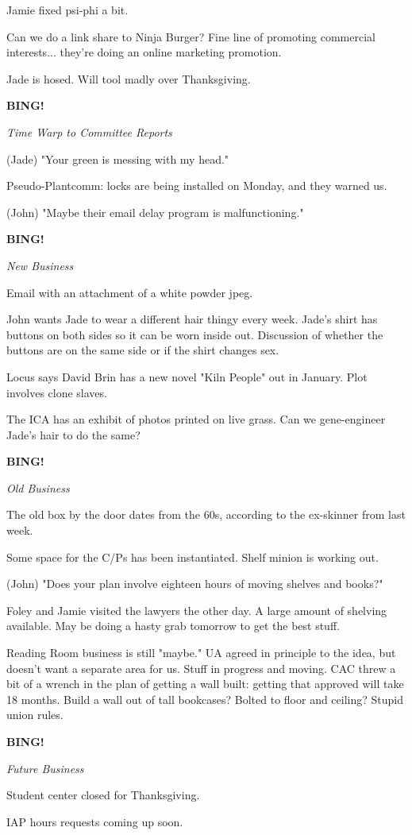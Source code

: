 \documentclass[12pt]{article}
\newcommand{\bing}{{\bf BING!} }
\newcommand{\goto}[1]{\bing \vskip 12pt \centerline{{\em{#1}}}}
\begin{document}
Jamie fixed psi-phi a bit.

Can we do a link share to Ninja Burger? Fine line of promoting commercial interests... they're doing an online marketing promotion.

Jade is hosed. Will tool madly over Thanksgiving.

\goto{Time Warp to Committee Reports}

(Jade) "Your green is messing with my head."

Pseudo-Plantcomm: locks are being installed on Monday, and they warned us.

(John) "Maybe their email delay program is malfunctioning."

\goto{New Business}

Email with an attachment of a white powder jpeg.

John wants Jade to wear a different hair thingy every week. Jade's shirt has buttons on both sides so it can be worn inside out. Discussion of whether the buttons are on the same side or if the shirt changes sex.

Locus says David Brin has a new novel "Kiln People" out in January. Plot involves clone slaves.

The ICA has an exhibit of photos printed on live grass. Can we gene-engineer Jade's hair to do the same?

\goto{Old Business}

The old box by the door dates from the 60s, according to the ex-skinner from last week.

Some space for the C/Ps has been instantiated. Shelf minion is working out.

(John) "Does your plan involve eighteen hours of moving shelves and books?"

Foley and Jamie visited the lawyers the other day. A large amount of shelving available. May be doing a hasty grab tomorrow to get the best stuff.

Reading Room business is still "maybe." UA agreed in principle to the idea, but doesn't want a separate area for us. Stuff in progress and moving. CAC threw a bit of a wrench in the plan of getting a wall built: getting that approved will take 18 months. Build a wall out of tall bookcases? Bolted to floor and ceiling? Stupid union rules.

\goto{Future Business}

Student center closed for Thanksgiving.

IAP hours requests coming up soon.
\end{document}
